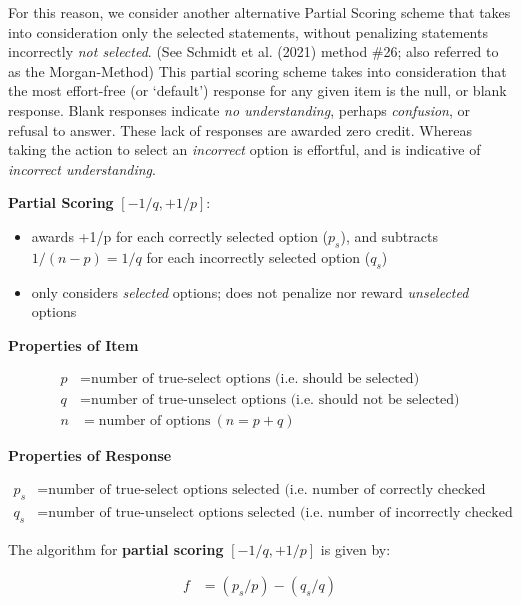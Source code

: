 \documentclass[
  letterpaper,
  DIV=11,
  numbers=noendperiod]{scrreprt}
\providecommand{\tightlist}{%
  \setlength{\itemsep}{0pt}\setlength{\parskip}{0pt}}\usepackage{longtable,booktabs,array}
\begin{document}
For this reason, we consider another alternative Partial Scoring scheme
that takes into consideration only the selected statements, without
penalizing statements incorrectly \emph{not selected}. (See Schmidt et
al. (2021) method \#26; also referred to as the Morgan-Method) This
partial scoring scheme takes into consideration that the most
effort-free (or `default') response for any given item is the null, or
blank response. Blank responses indicate \emph{no understanding},
perhaps \emph{confusion}, or refusal to answer. These lack of responses
are awarded zero credit. Whereas taking the action to select an
\emph{incorrect} option is effortful, and is indicative of
\emph{incorrect understanding}.

\textbf{Partial Scoring} \([-1/q, +1/p]\):

\begin{itemize}
\tightlist
\item
  awards +1/p for each correctly selected option (\(p_s\)), and
  subtracts \(1/(n-p) = 1/q\) for each incorrectly selected option
  (\(q_s\))
\item
  only considers \emph{selected} options; does not penalize nor reward
  \emph{unselected} options
\end{itemize}

\textbf{Properties of Item}

\begin{align}
p &= \text{number of true-select options (i.e. should be selected)} \\
q &= \text{number of true-unselect options (i.e. should not be selected)} \\
n &= \text{number of options} \: ( n = p + q)
\end{align}

\textbf{Properties of Response}

\begin{align}
p_s &= \text{number of true-select options selected (i.e. number of correctly checked options)}\\
q_s &= \text{number of true-unselect options selected (i.e. number of incorrectly checked options }
\end{align}

The algorithm for \textbf{partial scoring} \([-1/q, +1/p]\) is given by:

\begin{align}
f &= (p_s / p) - ({q_s}/{q}) \\
\end{align}
\end{document}
